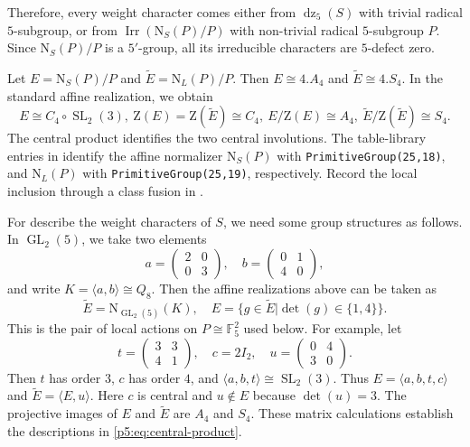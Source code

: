 \documentclass[11pt,a4paper]{article}
\numberwithin{equation}{section}
\theoremstyle{definition}
\theoremstyle{remark}
\newcommand{\Irr}{\operatorname{Irr}}
\newcommand{\GL}{\operatorname{GL}}
\newcommand{\SL}{\operatorname{SL}}
\newcommand{\dz}{\operatorname{dz}}
\newcommand{\ZZ}{\mathrm{Z}}
\newcommand{\FF}{\mathbb F}
\newcommand{\NN}{\mathrm N}
\newcommand{\et}{\widetilde E}
\begin{document}
Therefore, every weight character comes either from $\dz_5(S)$ with trivial radical $5$-subgroup, or from
$\Irr(\NN_S(P)/P)$ with non-trivial radical $5$-subgroup $P$. Since $\NN_S(P)/P$ is a $5'$-group, all its irreducible characters are $5$-defect zero.


Let \(E=\NN_S(P)/P\) and \(\et=\NN_L(P)/P\). 
Then $E\cong 4.A_4$ and $\et\cong 4.S_4$.  In the standard affine realization, we obtain
\begin{equation}\label{p5:eq:central-product}
 E\cong C_4\circ\SL_2(3),\
 \ZZ(E)=\ZZ(\et)\cong C_4,\
 E/\ZZ(E)\cong A_4,\
 \et/\ZZ(\et)\cong S_4.
\end{equation}
The central product identifies the two central involutions.
The table-library entries in \cite{T} identify the affine normalizer $\NN_S(P)$  with \texttt{PrimitiveGroup(25,18)}, and $\NN_L(P)$  with \texttt{PrimitiveGroup(25,19)}, respectively.
Record the local inclusion through a  class fusion
in \cite{T}.


For describe the weight characters of $S$, we need some group structures as follows. In \(\GL_2(5)\), we take two elements
\[
a=\begin{pmatrix}2&0\\0&3\end{pmatrix},\quad b=\begin{pmatrix}0&1\\4&0\end{pmatrix},
\]
and write $K=\langle a,b\rangle\cong Q_8$.
Then the affine realizations above can be taken as
\begin{equation*}%
 \et=\NN_{\GL_2(5)}(K),\quad
 E=\{g\in\et|\det(g)\in\{1,4\}\}.
\end{equation*}
This is the pair of local actions on \(P\cong\FF_5^2\) used below. For example, let
\[
t=\begin{pmatrix}3&3\\4&1\end{pmatrix},\quad
c=2I_2,\quad
u=\begin{pmatrix}0&4\\3&0\end{pmatrix}.
\]
Then \(t\) has order \(3\), \(c\) has order \(4\), and
$\langle a,b,t\rangle\cong\SL_2(3)$. Thus
$E=\langle a,b,t,c\rangle$ and  $\et=\langle E,u\rangle$.
Here \(c\) is central and \(u\notin E\) because \(\det(u)=3\). The projective images of \(E\) and \(\et\) are \(A_4\) and \(S_4\). These matrix calculations establish the descriptions in \eqref{p5:eq:central-product}.
\end{document}
